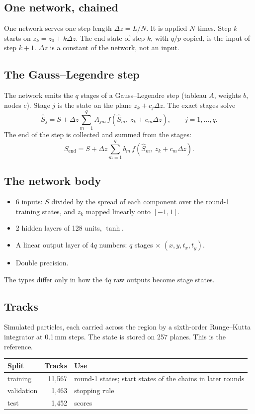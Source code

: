 \documentclass[11pt,a4paper]{article}
\newcommand{\dz}{\Delta z}
\newcommand{\Shat}{\hat S}
\begin{document}
\subsection*{One network, chained}

One network serves one step length $\dz = L/N$. It is applied $N$ times. Step $k$ starts on $z_k = z_0 + k\dz$. The end state of step $k$, with $q/p$ copied, is the input of step $k+1$. $\dz$ is a constant of the network, not an input.

\subsection*{The Gauss--Legendre step}

The network emits the $q$ stages of a Gauss--Legendre step (tableau $A$, weights $b$, nodes $c$). Stage $j$ is the state on the plane $z_k + c_j\dz$. The exact stages solve
\[
\Shat_j = S + \dz \sum_{m=1}^{q} A_{jm}\, f(\Shat_m,\ z_k + c_m \dz), \qquad j = 1,\dots,q.
\]
The end of the step is collected and summed from the stages:
\[
S_{\text{end}} = S + \dz \sum_{m=1}^{q} b_m\, f(\Shat_m,\ z_k + c_m \dz).
\]

\subsection*{The network body}

\begin{itemize}
\item 6 inputs: $S$ divided by the spread of each component over the round-1 training states, and $z_k$ mapped linearly onto $[-1, 1]$.
\item 2 hidden layers of 128 units, $\tanh$.
\item A linear output layer of $4q$ numbers: $q$ stages $\times$ $(x, y, t_x, t_y)$.
\item Double precision.
\end{itemize}

The types differ only in how the $4q$ raw outputs become stage states.

\subsection*{Tracks}

Simulated particles, each carried across the region by a sixth-order Runge--Kutta integrator at 0.1\,mm steps. The state is stored on 257 planes. This is the reference.

\begin{center}
\footnotesize
\begin{tabular}{@{}lrl@{}}
\toprule
Split & Tracks & Use \\
\midrule
training & 11,567 & round-1 states; start states of the chains in later rounds \\
validation & 1,463 & stopping rule \\
test & 1,452 & scores \\
\bottomrule
\end{tabular}
\end{center}
\end{document}
